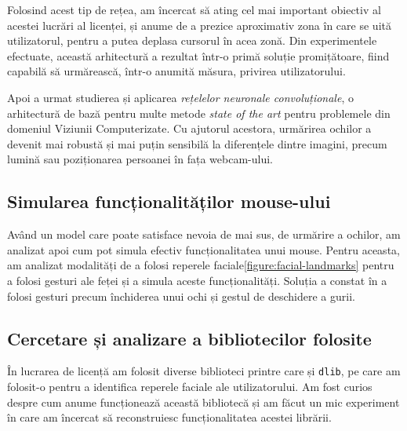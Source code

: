 
Folosind acest tip de rețea, am încercat să ating cel mai important obiectiv al acestei lucrări al licenței, și anume de a prezice aproximativ zona în care se uită utilizatorul, pentru a putea deplasa cursorul în acea zonă.
Din experimentele efectuate, această arhitectură a rezultat într-o primă soluție promițătoare, fiind capabilă să urmărească, într-o anumită măsura, privirea utilizatorului.

Apoi a urmat studierea și aplicarea \emph{rețelelor neuronale convoluționale}, o arhitectură de bază pentru multe metode \emph{state of the art} pentru problemele din domeniul Viziunii Computerizate.
Cu ajutorul acestora, urmărirea ochilor a devenit mai robustă și mai puțin sensibilă la diferențele dintre imagini, precum lumină sau poziționarea persoanei în fața webcam-ului.

\subsection{Simularea funcționalităților mouse-ului}
Având un model care poate satisface nevoia de mai sus, de urmărire a ochilor, am analizat apoi cum pot simula efectiv funcționalitatea unui mouse.
Pentru aceasta, am analizat modalități de a folosi reperele faciale\ref{figure:facial-landmarks} pentru a folosi gesturi ale feței și a simula aceste funcționalități.
Soluția a constat în a folosi gesturi precum închiderea unui ochi și gestul de deschidere a gurii.

\subsection{Cercetare și analizare a bibliotecilor folosite}
În lucrarea de licență am folosit diverse biblioteci printre care și \lstinline{dlib}, pe care am folosit-o pentru a identifica reperele faciale ale utilizatorului.
Am fost curios despre cum anume funcționează această bibliotecă și am făcut un mic experiment în care am încercat să reconstruiesc funcționalitatea acestei librării.